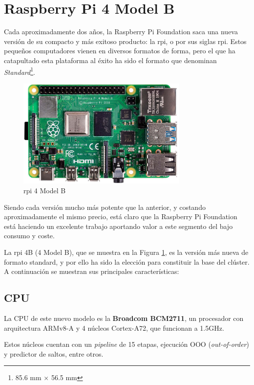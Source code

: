\section{Raspberry Pi 4 Model B}
Cada aproximadamente dos años, la Raspberry Pi Foundation saca una nueva versión de su compacto y más exitoso producto: la \acrlong{rpi}, o por sus siglas \acrshort{rpi}. Estos pequeños computadores vienen en diversos formatos de forma, pero el que ha catapultado esta plataforma al éxito ha sido el formato que denominan \textit{Standard}\footnote{85.6 mm × 56.5 mm}.

\begin{figure}[h!]
  \centering
  \includegraphics[width=0.75\textwidth]{img/rpi_parts/rpi_base.jpg}
  \caption{\acrlong{rpi} 4 Model B}
  \label{fig:rpi_base}
\end{figure}

Siendo cada versión mucho más potente que la anterior, y costando aproximadamente el mismo precio, está claro que la Raspberry Pi Foundation está haciendo un excelente trabajo aportando valor a este segmento del bajo consumo y coste.

La \acrlong{rpi} 4B (4 Model B), que se muestra en la Figura \ref{fig:rpi_base}, es la versión más nueva de formato standard, y por ello ha sido la elección para constituir la base del clúster. A continuación se muestran sus principales características: \cite{rpi4b_specifications}

\subsection{CPU}
La CPU de este nuevo modelo es la \textbf{Broadcom BCM2711}, un procesador con arquitectura ARMv8-A y 4 núcleos Cortex-A72, que funcionan a 1.5GHz.

Estos núcleos cuentan con un \textit{pipeline} de 15 etapas, ejecución OOO (\textit{out-of-order}) y predictor de saltos, entre otros.

